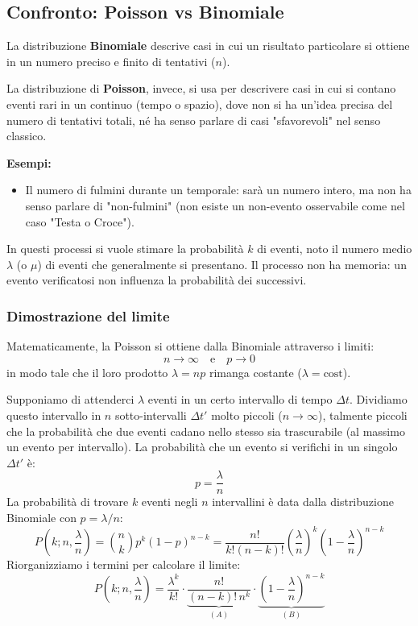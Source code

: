 \documentclass{article}
\theoremstyle{remark}
\begin{document}
\subsection{Confronto: Poisson vs Binomiale}
La distribuzione \textbf{Binomiale} descrive casi in cui un risultato particolare si ottiene in un numero preciso e finito di tentativi ($n$).

La distribuzione di \textbf{Poisson}, invece, si usa per descrivere casi in cui si contano eventi rari in un continuo (tempo o spazio), dove non si ha un'idea precisa del numero di tentativi totali, né ha senso parlare di casi "sfavorevoli" nel senso classico.

\textbf{Esempi:}
\begin{itemize}
    \item Il numero di fulmini durante un temporale: sarà un numero intero, ma non ha senso parlare di "non-fulmini" (non esiste un non-evento osservabile come nel caso "Testa o Croce").
\end{itemize}
In questi processi si vuole stimare la probabilità $k$ di eventi, noto il numero medio $\lambda$ (o $\mu$) di eventi che generalmente si presentano. Il processo non ha memoria: un evento verificatosi non influenza la probabilità dei successivi.

\subsubsection*{Dimostrazione del limite}
Matematicamente, la Poisson si ottiene dalla Binomiale attraverso i limiti:
\[
n \to \infty \quad \text{e} \quad p \to 0
\]
in modo tale che il loro prodotto $\lambda = np$ rimanga costante ($\lambda = \text{cost}$).

Supponiamo di attenderci $\lambda$ eventi in un certo intervallo di tempo $\Delta t$. Dividiamo questo intervallo in $n$ sotto-intervalli $\Delta t'$ molto piccoli ($n \to \infty$), talmente piccoli che la probabilità che due eventi cadano nello stesso sia trascurabile (al massimo un evento per intervallo).
La probabilità che un evento si verifichi in un singolo $\Delta t'$ è:
\[
p = \frac{\lambda}{n}
\]
La probabilità di trovare $k$ eventi negli $n$ intervallini è data dalla distribuzione Binomiale con $p = \lambda/n$:
\[
P\left(k; n, \frac{\lambda}{n}\right) = \binom{n}{k} p^k (1-p)^{n-k} = \frac{n!}{k!(n-k)!} \left(\frac{\lambda}{n}\right)^k \left(1 - \frac{\lambda}{n}\right)^{n-k}
\]
Riorganizziamo i termini per calcolare il limite:
\[
P\left(k; n, \frac{\lambda}{n}\right) = \frac{\lambda^k}{k!} \cdot \underbrace{\frac{n!}{(n-k)! \, n^k}}_{(A)} \cdot \underbrace{\left(1 - \frac{\lambda}{n}\right)^{n-k}}_{(B)}
\]
\end{document}
